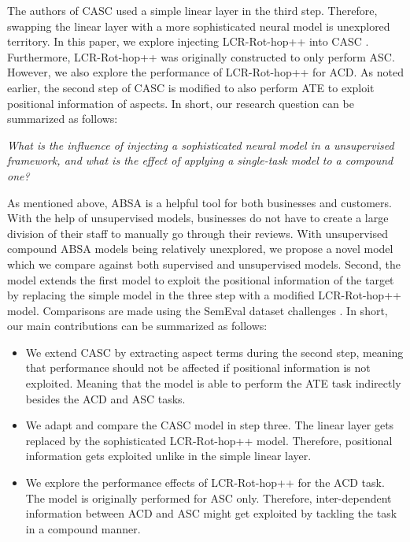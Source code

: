 \documentclass[american, oneside]{ecsgdp}
\begin{document}
The authors of CASC used a simple linear layer in the third step. Therefore, swapping the linear layer with a more sophisticated neural model is unexplored territory. In this paper, we explore injecting LCR-Rot-hop++ \parencite{Trusca2020HAABSA++} into CASC \parencite{Kumar2021CASC}. Furthermore, LCR-Rot-hop++ was originally constructed to only perform ASC. However, we also explore the performance of LCR-Rot-hop++ for ACD. As noted earlier, the second step of CASC is modified to also perform ATE to exploit positional information of aspects. In short, our research question can be summarized as follows:

\begin{center}
    \textit{What is the influence of injecting a sophisticated neural model in a unsupervised framework, and what is the effect of applying a single-task model to a compound one?}
\end{center}

As mentioned above, ABSA is a helpful tool for both businesses and customers. With the help of unsupervised models, businesses do not have to create a large division of their staff to manually go through their reviews. With unsupervised compound ABSA models being relatively unexplored, we propose a novel model which we compare against both supervised and unsupervised models. Second, the model extends the first model to exploit the positional information of the target by replacing the simple model in the three step with a modified LCR-Rot-hop++ model. Comparisons are made using the SemEval dataset challenges \parencite{Pontiki2015SemEval, Pontiki2016SemEval}. In short, our main contributions can be summarized as follows:

\begin{itemize}
    \item We extend CASC by extracting aspect terms during the second step, meaning that performance should not be affected if positional information is not exploited. Meaning that the model is able to perform the ATE task indirectly besides the ACD and ASC tasks.
    \item We adapt and compare the CASC model in step three. The linear layer gets replaced by the sophisticated LCR-Rot-hop++ model. Therefore, positional information gets exploited unlike in the simple linear layer.
    \item We explore the performance effects of LCR-Rot-hop++ for the ACD task. The model is originally performed for ASC only. Therefore, inter-dependent information between ACD and ASC might get exploited by tackling the task in a compound manner.
\end{itemize}
\end{document}
